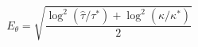 \documentclass{article}
\begin{document}
\fontsize{22}{29}\selectfont
\[
E_{\theta}=\sqrt{\frac{\log^2(\hat\tau/\tau^*)+\log^2(\hat\kappa/\kappa^*)}{2}}
\]
\end{document}
